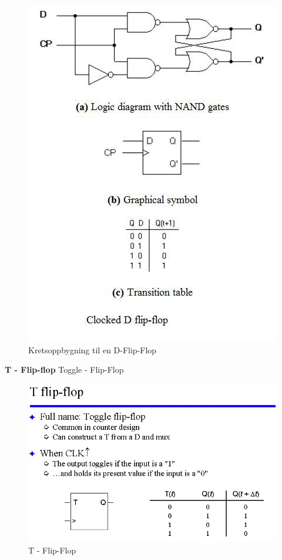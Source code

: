 \documentclass{article}
\begin{document}
	\begin{figure}[H]
		\includegraphics[scale = 0.6]{dFlip2.jpg}
		\caption{Kretsoppbygning til en D-Flip-Flop}
	\end{figure}
	
	\textbf{T - Flip-flop}
	Toggle - Flip-Flop
	
	\begin{figure}[H]
		\includegraphics[scale = 0.6]{tFlip.jpg}
		\caption{T - Flip-Flop}
	\end{figure}
	
\end{document}
